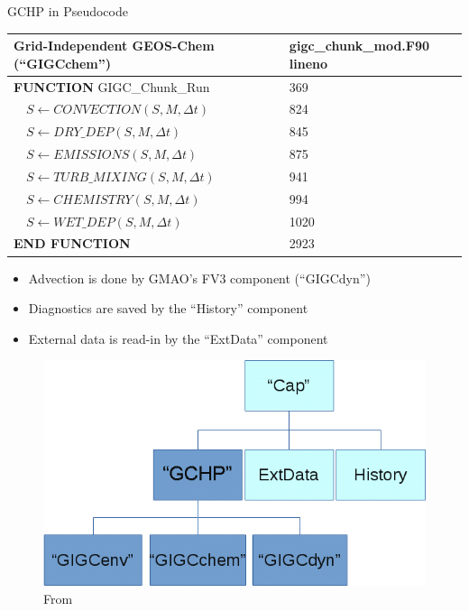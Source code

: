 \documentclass[10pt]{beamer}
\begin{document}
\begin{frame}[fragile]{GCHP in Pseudocode}

    \scriptsize
    \setlength{\tabcolsep}{20pt}
    \begin{table}[]
    \begin{tabular}{ll}
    \hline
    \textbf{Grid-Independent GEOS-Chem (``GIGCchem'')} & gigc\_chunk\_mod.F90 lineno \\ \hline
    \textbf{FUNCTION}   GIGC\_Chunk\_Run & 369 \\
    $\quad S \leftarrow CONVECTION(S, M, \Delta t)$ & 824 \\
    $\quad S \leftarrow DRY\_DEP(S, M, \Delta t)$ & 845 \\
    $\quad S \leftarrow EMISSIONS(S, M, \Delta t)$ & 875 \\
    $\quad S \leftarrow TURB\_MIXING(S, M, \Delta t)$ & 941 \\
    $\quad S \leftarrow CHEMISTRY(S, M, \Delta t)$& 994 \\
    $\quad S \leftarrow WET\_DEP(S, M, \Delta t)$ & 1020 \\
    \textbf{END FUNCTION} & 2923 \\ \hline
    \end{tabular}
    \end{table}
    \vfill
    \footnotesize
    \begin{minipage}[c]{0.6\textwidth}
        \begin{itemize}
            \item Advection is done by GMAO's FV3 component (``GIGCdyn'')
            \item Diagnostics are saved by the ``History'' component
            \item External data is read-in by the ``ExtData'' component
        \end{itemize}
    \end{minipage}
    \begin{minipage}[c]{0.39\textwidth}
        \begin{figure}
            \centering
            \includegraphics[width=\textwidth]{gchp_components.png}
            \captionsetup{labelformat=empty}
            \caption{From \cite{geos-chem_developers_developing_2019}}
        \end{figure}
    \end{minipage}
    

\end{frame}
\end{document}
